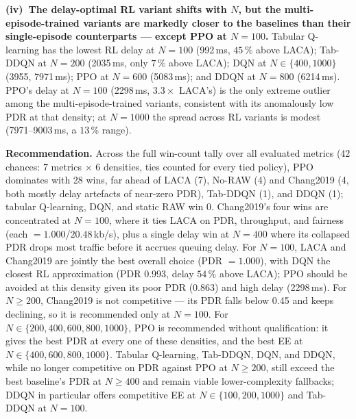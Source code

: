 \documentclass[conference]{IEEEtran}
\begin{document}
\textbf{(iv)~The delay-optimal RL variant shifts with $N$, but the
multi-episode-trained variants are markedly closer to the baselines than
their single-episode counterparts — except PPO at $N=100$.}
Tabular Q-learning has the lowest RL delay at $N=100$ (992\,ms, $45\,\%$
above LACA); Tab-DDQN at $N=200$ (2035\,ms, only $7\,\%$ above LACA); DQN at
$N\in\{400,1000\}$ (3955, 7971\,ms); PPO at $N=600$ (5083\,ms); and DDQN at
$N=800$ (6214\,ms).
PPO's delay at $N=100$ (2298\,ms, $3.3\times$ LACA's) is the only extreme
outlier among the multi-episode-trained variants, consistent with its
anomalously low PDR at that density; at $N=1000$ the spread across RL
variants is modest (7971--9003\,ms, a $13\,\%$ range).

\textbf{Recommendation.}
Across the full win-count tally over all evaluated metrics (42 chances: 7
metrics $\times$ 6 densities, ties counted for every tied policy), PPO
dominates with 28 wins, far ahead of LACA (7), No-RAW (4) and Chang2019 (4,
both mostly delay artefacts of near-zero PDR), Tab-DDQN (1), and DDQN (1);
tabular Q-learning, DQN, and static RAW win 0.
Chang2019's four wins are concentrated at $N=100$, where it ties LACA on
PDR, throughput, and fairness (each $=1.000$/$20.48$\,kb/s), plus a single
delay win at $N=400$ where its collapsed PDR drops most traffic before it
accrues queuing delay.
For $N=100$, LACA and Chang2019 are jointly the best overall choice
(PDR $=1.000$), with DQN the closest RL approximation (PDR 0.993, delay
$54\,\%$ above LACA); PPO should be avoided at this density given its poor
PDR (0.863) and high delay (2298\,ms).
For $N\geq200$, Chang2019 is not competitive — its PDR falls below 0.45 and
keeps declining, so it is recommended only at $N=100$.
For $N\in\{200,400,600,800,1000\}$, PPO is recommended without
qualification: it gives the best PDR at every one of these densities, and
the best EE at $N\in\{400,600,800,1000\}$.
Tabular Q-learning, Tab-DDQN, DQN, and DDQN, while no longer competitive on
PDR against PPO at $N\geq200$, still exceed the best baseline's PDR at
$N\geq400$ and remain viable lower-complexity fallbacks; DDQN in particular
offers competitive EE at $N\in\{100,200,1000\}$ and Tab-DDQN at $N=100$.
\end{document}
